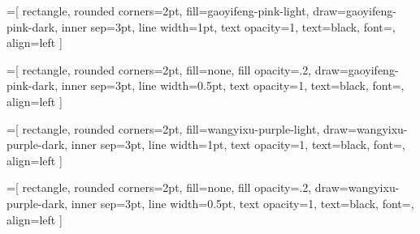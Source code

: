 =[
    rectangle,
    rounded corners=2pt, 
    fill=gaoyifeng-pink-light, 
    draw=gaoyifeng-pink-dark, 
    inner sep=3pt, 
    line width=1pt,
    text opacity=1,
    text=black, 
    font=\tiny, 
    align=left 
]

=[
    rectangle,
    rounded corners=2pt, 
    fill=none, 
    fill opacity=.2,
    draw=gaoyifeng-pink-dark,
    inner sep=3pt, 
    line width=0.5pt,
    text opacity=1,
    text=black, 
    font=\tiny, 
    align=left 
]

=[
    rectangle,
    rounded corners=2pt, 
    fill=wangyixu-purple-light, 
    draw=wangyixu-purple-dark, 
    inner sep=3pt, 
    line width=1pt,
    text opacity=1,
    text=black, 
    font=\tiny, 
    align=left 
]

=[
    rectangle,
    rounded corners=2pt, 
    fill=none, 
    fill opacity=.2,
    draw=wangyixu-purple-dark,
    inner sep=3pt, 
    line width=0.5pt,
    text opacity=1,
    text=black, 
    font=\tiny, 
    align=left 
]

